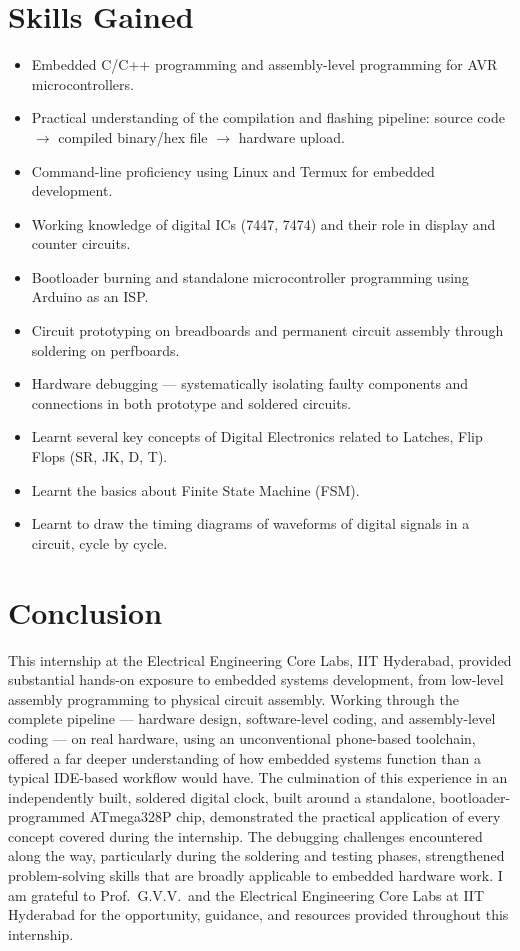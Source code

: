 \documentclass[12pt,a4paper]{report}
\begin{document}
\chapter{Skills Gained}
\label{ch:skills}
\begin{itemize}
    \item Embedded C/C++ programming and assembly-level programming for AVR microcontrollers.
    \item Practical understanding of the compilation and flashing pipeline: source code $\rightarrow$ compiled binary/hex file $\rightarrow$ hardware upload.
    \item Command-line proficiency using Linux and Termux for embedded development.
    \item Working knowledge of digital ICs (7447, 7474) and their role in display and counter circuits.
    \item Bootloader burning and standalone microcontroller programming using Arduino as an ISP.
    \item Circuit prototyping on breadboards and permanent circuit assembly through soldering on perfboards.
    \item Hardware debugging --- systematically isolating faulty components and connections in both prototype and soldered circuits.
    \item Learnt several key concepts of Digital Electronics related to Latches, Flip Flops (SR, JK, D, T).
    \item Learnt the basics about Finite State Machine (FSM).
    \item Learnt to draw the timing diagrams of waveforms of digital signals in a circuit, cycle by cycle.
\end{itemize}
\chapter{Conclusion}
\label{ch:conclusion}
This internship at the Electrical Engineering Core Labs, IIT Hyderabad, provided substantial hands-on exposure to embedded systems development, from low-level assembly programming to physical circuit assembly. Working through the complete pipeline --- hardware design, software-level coding, and assembly-level coding --- on real hardware, using an unconventional phone-based toolchain, offered a far deeper understanding of how embedded systems function than a typical IDE-based workflow would have. The culmination of this experience in an independently built, soldered digital clock, built around a standalone, bootloader-programmed ATmega328P chip, demonstrated the practical application of every concept covered during the internship. The debugging challenges encountered along the way, particularly during the soldering and testing phases, strengthened problem-solving skills that are broadly applicable to embedded hardware work.
I am grateful to Prof.\ G.V.V.\ and the Electrical Engineering Core Labs at IIT Hyderabad for the opportunity, guidance, and resources provided throughout this internship.
\appendix
\end{document}
